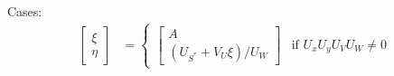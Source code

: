 \documentclass[10pt]{article}
\begin{document}
\begin{itemize}
        Cases:
        \begin{align}
            \begin{bmatrix}
                \xi \\
                \eta
            \end{bmatrix}
            &=
            \begin{cases}
                \begin{bmatrix}
                    A \\
                    (U_{S^*} + V_U \xi) / U_W
                \end{bmatrix} & \mbox{if } U_x U_y U_V U_W \ne 0
            \end{cases}
        \end{align}

\end{itemize}
\printbibliography
\end{document}

